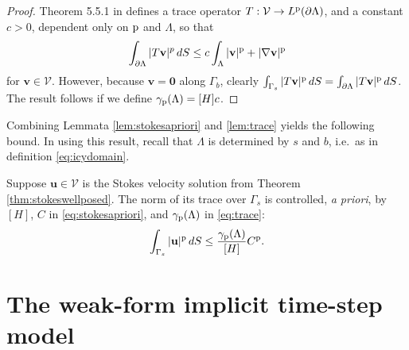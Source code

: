 \documentclass[hidelinks,onefignum,onetabnum,final]{siamart220329}  %
\newcommand{\grad}{\nabla}
\newcommand{\bu}{\mathbf{u}}
\newcommand{\bv}{\mathbf{v}}
\newcommand{\bzero}{\bm{0}}
\newcommand{\cV}{\mathcal{V}}
\newcommand{\pp}{{\text{\textnormal{p}}}}
\begin{document}
\begin{proof}
Theorem 5.5.1 in \cite{Evans2010} defines a trace operator $T:\cV\to L^\pp(\partial\Lambda)$, and a constant $c>0$, dependent only on $\pp$ and $\Lambda$, so that
\begin{equation}
\int_{\partial\Lambda} |T\bv|^p\,dS \le c \int_{\Lambda} |\bv|^\pp + |\grad\bv|^\pp \label{eq:tracework}
\end{equation}
for $\bv\in\cV$.  However, because $\bv=\bzero$ along $\Gamma_b$, clearly $\int_{\Gamma_s} |T\bv|^\pp\,dS = \int_{\partial\Lambda} |T\bv|^\pp\,dS$.  The result follows if we define $\gamma_{\pp}(\Lambda)=[H] c$.
\end{proof}

Combining Lemmata \ref{lem:stokesapriori} and \ref{lem:trace} yields the following bound.  In using this result, recall that $\Lambda$ is determined by $s$ and $b$, i.e.~as in definition \eqref{eq:icydomain}.

\begin{corollary} \label{cor:surfacetracebound}
Suppose $\bu\in\cV$ is the Stokes velocity solution from Theorem \ref{thm:stokeswellposed}.  The norm of its trace over $\Gamma_s$ is controlled, \emph{a priori}, by $[H]$, $C$ in \eqref{eq:stokesapriori}, and $\gamma_{\pp}(\Lambda)$ in \eqref{eq:trace}:
\begin{equation}
\int_{\Gamma_s} |\bu|^\pp \,dS \le \frac{\gamma_{\pp}(\Lambda)}{[H]} C^\pp. \label{eq:surfacetracebound}
\end{equation}
\end{corollary}


\section{The weak-form implicit time-step model} \label{sec:model}
\end{document}
